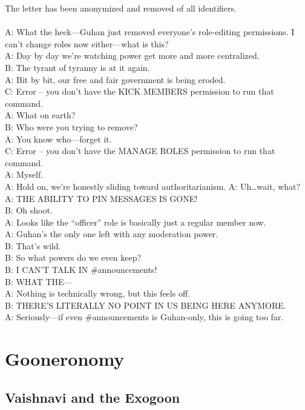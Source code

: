 \documentclass{article}
\begin{document}
The letter has been anonymized and removed of all identifiers.
\\ \\
A: What the heck—Guhan just removed everyone’s role-editing permissions. I can’t change roles now either—what is this? \\
A: Day by day we’re watching power get more and more centralized.\\
B: The tyrant of tyranny is at it again.\\
A: Bit by bit, our free and fair government is being eroded.\\
C: Error – you don’t have the KICK MEMBERS permission to run that command.\\
A: What on earth?\\
B: Who were you trying to remove?\\
A: You know who—forget it.\\
C: Error – you don’t have the MANAGE ROLES permission to run that command.\\
A: Myself.\\
A: Hold on, we’re honestly sliding toward authoritarianism.
A: Uh…wait, what?\\
A: THE ABILITY TO PIN MESSAGES IS GONE!\\
B: Oh shoot.\\
A: Looks like the “officer” role is basically just a regular member now.\\
A: Guhan’s the only one left with any moderation power.\\
B: That’s wild.\\
B: So what powers do we even keep?\\
B: I CAN’T TALK IN \#announcements!\\
B: WHAT THE—\\
A: Nothing is technically wrong, but this feels off.\\
B: THERE’S LITERALLY NO POINT IN US BEING HERE ANYMORE.\\
A: Seriously—if even \#announcements is Guhan-only, this is going too far.

\section{Gooneronomy}

\subsection{Vaishnavi and the Exogoon}
\end{document}
